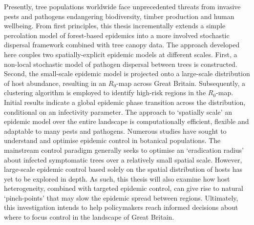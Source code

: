 Presently, tree populations worldwide face unprecedented threats from invasive pests and pathogens endangering biodiversity, timber production and human wellbeing. 
From first principles, this thesis incrementally extends a simple percolation model of forest-based epidemics into a more involved stochastic dispersal framework combined with tree canopy data. 
The approach developed here couples two spatially-explicit epidemic models at different scales. 
First, a non-local stochastic model of pathogen dispersal between trees is constructed. 
Second, the small-scale epidemic model is projected onto a large-scale distribution of host abundance, resulting in an $R_0$-map across Great Britain. 
Subsequently, a clustering algorithm is employed to identify high-risk regions in the $R_0$-map. 
Initial results indicate a global epidemic phase transition across the distribution, conditional on an infectivity parameter.
The approach to `spatially scale' an epidemic model over the entire landscape is computationally efficient, flexible and adaptable to many pests and pathogens. 
Numerous studies have sought to understand and optimise epidemic control in botanical populations. 
The mainstream control paradigm generally seeks to optimise an `eradication radius' about infected symptomatic trees over a relatively small spatial scale. However, large-scale epidemic control based solely on the spatial distribution of hosts has yet to be explored in depth. 
As such, this thesis will also examine how host heterogeneity, combined with targeted epidemic control, can give rise to natural `pinch-points' that may slow the epidemic spread between regions. 
Ultimately, this investigation intends to help policymakers reach informed decisions about where to focus control in the landscape of Great Britain.

\newcommand{\RNum}[1]{\uppercase\expandafter{\romannumeral #1\relax}}
